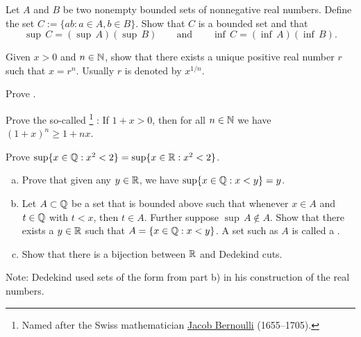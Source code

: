 \begin{exercise}
Let $A$ and $B$ be two nonempty bounded sets of nonnegative real numbers.
Define the set
$C := \{ ab : a \in A, b \in B \}$.
Show that $C$ is a bounded set and that
\begin{equation*}
\sup\,C = (\sup\,A )( \sup\,B) 
\qquad \text{and} \qquad
\inf\,C = (\inf\,A )( \inf\,B).
\end{equation*}
\end{exercise}

\begin{exercise}[Hard] \label{exercise:rootexistshard}
Given $x > 0$ and $n \in {\mathbb{N}}$, show that there exists a unique positive
real number $r$ such that $x = r^n$.  Usually $r$ is denoted by $x^{1/n}$.
\end{exercise}

\begin{exercise}[Easy]
Prove .
\end{exercise}

\begin{exercise} \label{exercise:bernoulliineq}
Prove the so-called \emph{}%
\footnote{%
Named after the Swiss mathematician
\href{https://en.wikipedia.org/wiki/Jacob_Bernoulli}{Jacob Bernoulli}
(1655--1705).}%
: If $1+x > 0$, then
for all $n \in {\mathbb{N}}$ we have $(1+x)^n \geq 1+nx$.
\end{exercise}

\begin{exercise} \label{exercise:sqrt2QorR}
Prove $\sup \{ x \in {\mathbb{Q}} : x^2 < 2 \} = \sup \{ x \in {\mathbb{R}} : x^2 < 2 \}$.
\end{exercise}

\begin{exercise} \label{exercise:Dedekind}
\leavevmode
\begin{enumerate}[a)]
\item
Prove that given any $y \in {\mathbb{R}}$, we have $\sup \{ x \in {\mathbb{Q}} : x < y \} = y$.
\item
Let $A \subset {\mathbb{Q}}$ be a set that is bounded above such that whenever $x
\in A$ and $t \in {\mathbb{Q}}$ with $t < x$, then $t \in A$.  Further suppose 
$\sup\, A \not\in A$.  Show that there exists a $y \in {\mathbb{R}}$ such that
$A = \{ x \in {\mathbb{Q}} : x < y \}$.  A set such as $A$ is called a
\emph{}.
\item
Show that there is a bijection between ${\mathbb{R}}$ and Dedekind cuts.
\end{enumerate}
Note: Dedekind used sets of the form from part b) in his construction of the
real numbers.
\end{exercise}

